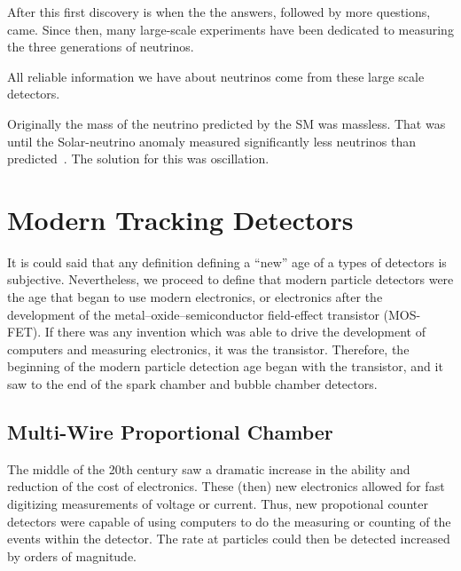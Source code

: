 After this first discovery is when the the answers, followed by more questions, came.
Since then, many large-scale experiments have been dedicated to measuring the three generations of neutrinos.
~\citep{SNO_2002_neutrino_PhysRevLett.89.011301,
neutrino_measurement_NOvA_2019_prl,
t2k_2011_neutrino_PhysRevLett.107.041801,
reno_2012_neutrino_PhysRevLett.108.191802,
FUKUDA2002_solar_neutrino_oscillation,
kamland_2003_neutrino_PhysRevLett.90.021802,
daya_bay_2012_neutrino_PhysRevLett.108.171803,
doubleChooz_2012_neutrino_PhysRevLett.108.131801}

All reliable information we have about neutrinos come from these large scale detectors.

Originally the mass of the neutrino predicted by the SM was massless.
That was until the Solar-neutrino anomaly measured significantly less neutrinos than predicted~\citep{solar_neutrino_problem_PhysRevLett.20.1205}.
The solution for this was oscillation.

\section{Modern Tracking Detectors}

It is could said that any definition defining a ``new'' age of a types of detectors is subjective.
Nevertheless, we proceed to define that modern particle detectors were the age that began to use modern electronics, or electronics after the development of the metal–oxide–semiconductor field-effect transistor (MOS-FET).
If there was any invention which was able to drive the development of computers and  measuring electronics, it was the transistor.
Therefore, the beginning of the modern particle detection age began with the transistor, and it saw to the end of the spark chamber and bubble chamber detectors.

\subsection{Multi-Wire Proportional Chamber}

The middle of the 20th century saw a dramatic increase in the ability and reduction of the cost of electronics.
These (then) new electronics allowed for fast digitizing measurements of voltage or current.
Thus, new propotional counter detectors were capable of using computers to do the measuring or counting of the events within the detector.
The rate at particles could then be detected increased by orders of magnitude.

